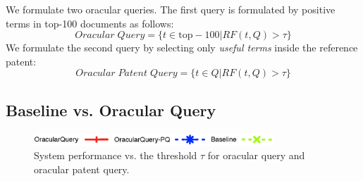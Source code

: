%

We formulate two oracular queries. The first query is formulated by positive terms in top-100 documents as follows: 
\begin{equation}
Oracular \; Query = \{t \in \mathrm{top-100}|RF(t, Q)>\tau\}   
 \label{eq:score}
\end{equation}
We formulate the second query by selecting only {\em useful terms} inside the reference patent:
\begin{equation}
 Oracular \; Patent \; Query = \{t\in Q|RF(t, Q)>\tau\}   
 \label{eq:score}
\end{equation}

\subsection{Baseline vs. Oracular Query}

\begin{figure}[t!]
\begin{centering}
\includegraphics[width=9cm]{imgs/legend}
\par\end{centering}

\begin{centering}
\par\end{centering}

\protect\caption{System performance vs. the threshold $\tau$ for oracular query and oracular patent query.}
\label{fig:oracular}
\end{figure}

